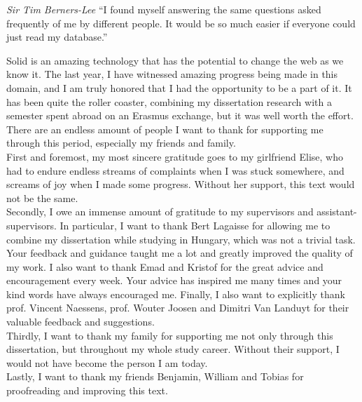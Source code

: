\begin{preface}
\begin{fancyquote}{\textit{Sir Tim Berners-Lee}}
``I found myself answering the same questions asked frequently of me by different people. It would be so much easier if everyone could just read my database.''
\end{fancyquote}

\noindent Solid is an amazing technology that has the potential to change the web as we know it. The last year, I have witnessed amazing progress being made in this domain, and I am truly honored that I had the opportunity to be a part of it. It has been quite the roller coaster, combining my dissertation research with a semester spent abroad on an Erasmus exchange, but it was well worth the effort.\\

\noindent There are an endless amount of people I want to thank for supporting me through this period, especially my friends and family.\\

\noindent First and foremost, my most sincere gratitude goes to my girlfriend Elise, who had to endure endless streams of complaints when I was stuck somewhere, and screams of joy when I made some progress. Without her support, this text would not be the same.\\

\noindent Secondly, I owe an immense amount of gratitude to my supervisors and assistant-supervisors. 
In particular, I want to thank Bert Lagaisse for allowing me to combine my dissertation while studying in Hungary, which was not a trivial task. Your feedback and guidance taught me a lot and greatly improved the quality of my work. I also want to thank Emad and Kristof for the great advice and encouragement every week. Your advice has inspired me many times and your kind words have always encouraged me. Finally, I also want to explicitly thank prof. Vincent Naessens, prof. Wouter Joosen and Dimitri Van Landuyt for their valuable feedback and suggestions.\\

\noindent Thirdly, I want to thank my family for supporting me not only through this dissertation, but throughout my whole study career. Without their support, I would not have become the person I am today.\\

\noindent Lastly, I want to thank my friends Benjamin, William and Tobias for proofreading and improving this text. 

\end{preface}